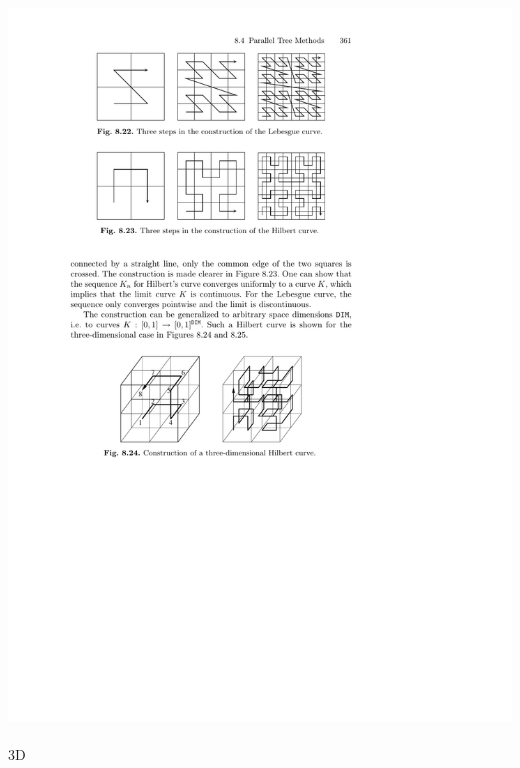 \documentclass[mathserif, 10pt]{beamer}
\begin{document}
\begin{frame}
\begin{minipage}[b]{0.40\linewidth}
	\includegraphics[viewport = 105 590 375 680, scale=0.6, clip]{figures/hilbertCurve.pdf}
	\ \\
	3D\\

\end{minipage}
\end{frame}
\end{document}
